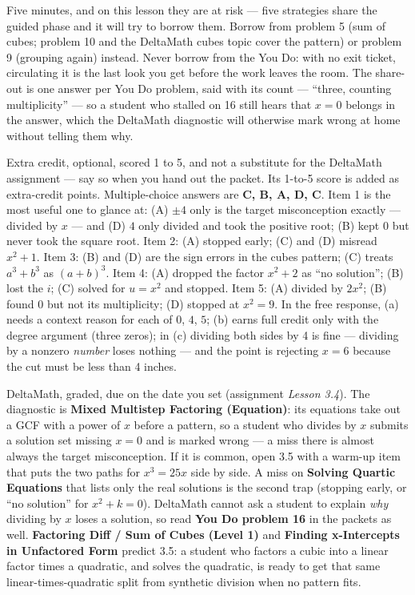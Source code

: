 \documentclass[10pt]{article}
\begin{document}
\begin{teachernote}[Debrief]
Five minutes, and on this lesson they are at risk --- five strategies share the guided phase and
it will try to borrow them. Borrow from problem 5 (sum of cubes; problem 10 and the DeltaMath
cubes topic cover the pattern) or problem 9 (grouping again) instead. Never borrow from the You
Do: with no exit ticket, circulating it is the last look you get before the work leaves the room.
The share-out is one answer per You Do problem, said with its count --- ``three, counting
multiplicity'' --- so a student who stalled on 16 still hears that $x = 0$ belongs in the answer,
which the DeltaMath diagnostic will otherwise mark wrong at home without telling them why.
\end{teachernote}

\begin{teachernote}[AP Practice]
Extra credit, optional, scored 1 to 5, and not a substitute for the DeltaMath assignment --- say
so when you hand out the packet. Its 1-to-5 score is added as extra-credit points.
Multiple-choice answers are \textbf{C, B, A, D, C}. Item 1 is the most useful one to glance at:
(A) $\pm 4$ only is the target misconception exactly --- divided by $x$ --- and (D) $4$ only
divided and took the positive root; (B) kept 0 but never took the square root. Item 2: (A)
stopped early; (C) and (D) misread $x^2 + 1$. Item 3: (B) and (D) are the sign errors in the
cubes pattern; (C) treats $a^3 + b^3$ as $(a + b)^3$. Item 4: (A) dropped the factor $x^2 + 2$
as ``no solution''; (B) lost the $i$; (C) solved for $u = x^2$ and stopped. Item 5:
(A) divided by $2x^2$; (B) found 0 but not its multiplicity; (D) stopped at $x^2 = 9$. In the
free response, (a) needs a context reason for each of $0$, $4$, $5$; (b) earns full credit only
with the degree argument (three zeros); in (c) dividing both sides by 4 is fine --- dividing by a
nonzero \emph{number} loses nothing --- and the point is rejecting $x = 6$ because the cut must be
less than 4 inches.
\end{teachernote}

\begin{teachernote}[Homework]
DeltaMath, graded, due on the date you set (assignment \textit{Lesson 3.4}). The diagnostic is
\textbf{Mixed Multistep Factoring (Equation)}: its equations take out a GCF with a power of $x$
before a pattern, so a student who divides by $x$ submits a solution set missing $x = 0$ and is
marked wrong --- a miss there is almost always the target misconception. If it is common, open
3.5 with a warm-up item that puts the two paths for $x^3 = 25x$ side by side. A miss on
\textbf{Solving Quartic Equations} that lists only the real solutions is the second trap
(stopping early, or ``no solution'' for $x^2 + k = 0$). DeltaMath cannot ask a student to
explain \emph{why} dividing by $x$ loses a solution, so read \textbf{You Do problem 16} in the
packets as well. \textbf{Factoring Diff / Sum of Cubes (Level 1)} and \textbf{Finding
x-Intercepts in Unfactored Form} predict 3.5: a student who factors a cubic into a linear
factor times a quadratic, and solves the quadratic, is ready to get that same linear-times-quadratic
split from synthetic division when no pattern fits.
\end{teachernote}
\end{document}
